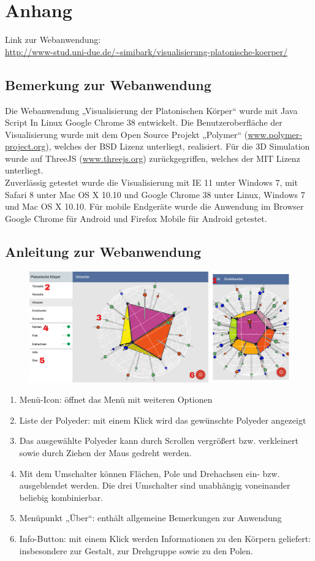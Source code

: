 \section*{Anhang}
Link zur Webanwendung:\\\url{http://www-stud.uni-due.de/~simibark/visualisierung-platonische-koerper/}
\subsection*{Bemerkung zur Webanwendung}
Die Webanwendung „Visualisierung der Platonischen Körper“ wurde mit Java Script In Linux Google Chrome 38 entwickelt. Die Benutzeroberfläche der Visualisierung wurde mit dem Open Source Projekt „Polymer“ (\url{www.polymer-project.org}), welches der BSD Lizenz unterliegt, realisiert. Für die 3D Simulation wurde auf ThreeJS (\url{www.threejs.org}) zurückgegriffen, welches der MIT Lizenz unterliegt.\\
Zuverlässig getestet wurde die Visualisierung mit IE 11 unter Windows 7, mit Safari 8 unter Mac OS X 10.10 und Google Chrome 38 unter Linux, Windows 7 und Mac OS X 10.10. Für mobile Endgeräte wurde die Anwendung im Browser Google Chrome für Android und Firefox Mobile für Android getestet.
\subsection*{Anleitung zur Webanwendung}
\begin{figure}[H]
    \centering
        \includegraphics[width=0.95\linewidth]{grafiken/anwendung.png}

\end{figure}
\begin{enumerate}
    \setlength{\itemsep}{-4pt}
    \item Menü-Icon: öffnet das Menü mit weiteren Optionen
    \item Liste der Polyeder: mit einem Klick wird das gewünschte Polyeder angezeigt
    \item Das ausgewählte Polyeder kann durch Scrollen vergrößert bzw. verkleinert sowie durch Ziehen der Maus gedreht werden.
    \item Mit dem Umschalter können Flächen, Pole und Drehachsen ein- bzw. ausgeblendet werden. Die drei Umschalter sind unabhängig voneinander beliebig kombinierbar.
    \item Menüpunkt „Über“: enthält allgemeine Bemerkungen zur Anwendung
    \item Info-Button: mit einem Klick werden Informationen zu den Körpern geliefert: insbesondere zur Gestalt, zur Drehgruppe sowie zu den Polen.
\end{enumerate}
